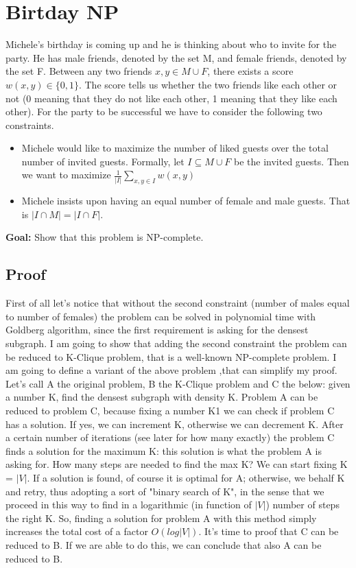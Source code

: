 \section{Birtday NP}
Michele's birthday is coming up and he is thinking about who to invite for the party. He has male friends, denoted by the set M, and female friends, denoted by the set F.
Between any two friends $x, y \in M \cup F$, there exists a score $w(x, y) \in \{0, 1\}$. The score tells us whether the two friends like each other or not (0 meaning that they do not like each other, 1 meaning that they like each other). For the party to be successful we have to consider the
following two constraints.
\begin{itemize}
	\item Michele would like to maximize the number of liked guests over the total number of
	invited guests. Formally, let $I \subseteq M \cup F$ be the invited guests. Then we want to maximize
	$\frac{1}{|I|} \sum_{x,y \in I} w(x,y)$
	\item Michele insists upon having an equal number of female and male guests. That is $|I \cap M| =
	|I \cap F|$.
\end{itemize}
\textbf{Goal:} Show that this problem is NP-complete.

\subsection{Proof}
First of all let's notice that without the second constraint (number of males equal to number of females) the problem can be solved in polynomial time with Goldberg algorithm, since the first requirement is asking for the densest subgraph. I am going to show that adding the second constraint the problem can be reduced to K-Clique problem, that is a well-known NP-complete problem. I am going to define a variant of the above problem ,that can simplify my proof. Let's call A the original problem, B the K-Clique problem and C the below: given a number K, find the densest subgraph with density K.
Problem A can be reduced to problem C, because fixing a number K1 we can check if problem C has a solution. If yes, we can increment K, otherwise we can decrement K. After a certain number of iterations (see later for how many exactly) the problem C finds a solution for the maximum K: this solution is what the problem A is asking for. How many steps are needed to find the max K? We can start fixing K = $|V|$. If a solution is found, of course it is optimal for A; otherwise, we behalf K and retry, thus adopting a sort of "binary search of K", in the sense that we proceed in this way to find in a logarithmic (in function of $|V|$) number of steps the right K. So, finding a solution for problem A with this method simply increases the total cost of a factor $O(log|V|)$. It's time to proof that C can be reduced to B. If we are able to do this, we can conclude that also A can be reduced to B.
